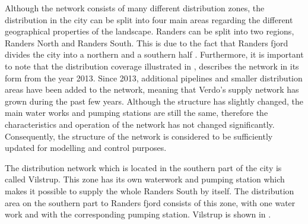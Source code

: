 \vspace{-3mm}

Although the network consists of many different distribution zones, the distribution in the city can be split into four main areas regarding the different geographical properties of the landscape. Randers can be split into two regions, Randers North and Randers South. This is due to the fact that Randers fjord divides the city into a northern and a southern half \cite{verdo}. Furthermore, it is important to note that the distribution coverage illustrated in , describes the network in its form from the year 2013. Since 2013, additional pipelines and smaller distribution areas have been added to the network, meaning that Verdo's supply network has grown during the past few years. Although the structure has slightly changed, the main water works and pumping stations are still the same, therefore the characteristics and operation of the network has not changed significantly. Consequently, the structure of the network is considered to be sufficiently updated for modelling and control purposes. 

The distribution network which is located in the southern part of the city is called Vilstrup. This zone has its own waterwork and pumping station which makes it possible to supply the whole Randers South by itself. The distribution area on the southern part to Randers fjord consists of this zone, with one water work and with the corresponding pumping station. Vilstrup is shown in .

